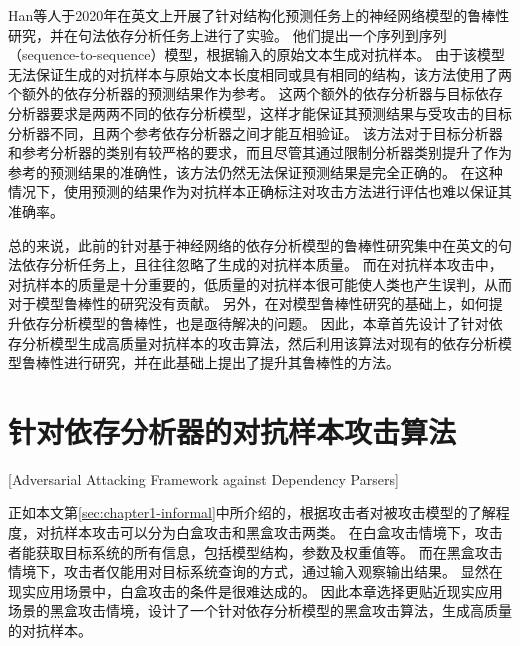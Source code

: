 Han等人\cite{han-etal-2020-adversarial}于2020年在英文上开展了针对结构化预测任务上的神经网络模型的鲁棒性研究，并在句法依存分析任务上进行了实验。
他们提出一个序列到序列（sequence-to-sequence）模型，根据输入的原始文本生成对抗样本。
由于该模型无法保证生成的对抗样本与原始文本长度相同或具有相同的结构，该方法使用了两个额外的依存分析器的预测结果作为参考。
这两个额外的依存分析器与目标依存分析器要求是两两不同的依存分析模型，这样才能保证其预测结果与受攻击的目标分析器不同，且两个参考依存分析器之间才能互相验证。
该方法对于目标分析器和参考分析器的类别有较严格的要求，而且尽管其通过限制分析器类别提升了作为参考的预测结果的准确性，该方法仍然无法保证预测结果是完全正确的。
在这种情况下，使用预测的结果作为对抗样本正确标注对攻击方法进行评估也难以保证其准确率。

总的来说，此前的针对基于神经网络的依存分析模型的鲁棒性研究集中在英文的句法依存分析任务上，且往往忽略了生成的对抗样本质量。
而在对抗样本攻击中，对抗样本的质量是十分重要的，低质量的对抗样本很可能使人类也产生误判，从而对于模型鲁棒性的研究没有贡献。
另外，在对模型鲁棒性研究的基础上，如何提升依存分析模型的鲁棒性，也是亟待解决的问题。
因此，本章首先设计了针对依存分析模型生成高质量对抗样本的攻击算法，然后利用该算法对现有的依存分析模型鲁棒性进行研究，并在此基础上提出了提升其鲁棒性的方法。

\section{针对依存分析器的对抗样本攻击算法}[Adversarial Attacking Framework against Dependency Parsers]

正如本文第\ref{sec:chapter1-informal}中所介绍的，根据攻击者对被攻击模型的了解程度，对抗样本攻击可以分为白盒攻击和黑盒攻击两类。
在白盒攻击情境下，攻击者能获取目标系统的所有信息，包括模型结构，参数及权重值等。
而在黑盒攻击情境下，攻击者仅能用对目标系统查询的方式，通过输入观察输出结果。
显然在现实应用场景中，白盒攻击的条件是很难达成的。
因此本章选择更贴近现实应用场景的黑盒攻击情境，设计了一个针对依存分析模型的黑盒攻击算法，生成高质量的对抗样本。


